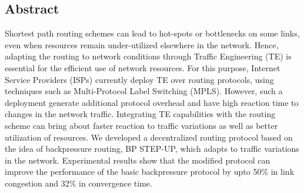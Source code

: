\label{sec:abstract}
\begin{center}
\section*{Abstract}
\end{center}

Shortest path routing schemes can lead to hot-spots or bottlenecks on some links, even when resources remain under-utilized elsewhere in the network. Hence, adapting the routing to network conditions through Traffic Engineering (TE) is essential for the efficient use of network resources. For this purpose, Internet Service Providers (ISPs) currently deploy TE over routing protocols, using techniques such as Multi-Protocol Label Switching (MPLS). However, such a deployment generate additional protocol overhead and have high reaction time to changes in the network traffic. Integrating TE capabilities with the routing scheme can bring about faster reaction to traffic variations as well as better utilization of resources. We developed a decentralized routing protocol based on the idea of backpressure routing, BP STEP-UP,  which adapts to traffic variations in the network. Experimental results show that the modified protocol can improve the performance of the basic backpressure protocol by upto 50\% in link congestion and 32\% in convergence time.



